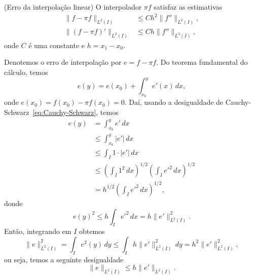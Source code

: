 \begin{prop}\normalfont(Erro da interpolação linear)\label{prop:interp_lin}
  O interpolador $\pi f$ satisfaz as estimativas
  \begin{align}
    \|f-\pi f\|_{L^2(I)} &\leq Ch^2\|f''\|_{L^2(I)},\\
    \|(f-\pi f)'\|_{L^2(I)} &\leq Ch\|f''\|_{L^2(I)},
  \end{align}
onde $C$ é uma constante e $h=x_1-x_0$.
\end{prop}
\begin{dem}
  Denotemos o erro de interpolação por $e = f - \pi f$. Do teorema fundamental do cálculo, temos
  \begin{equation}
    e(y) = e(x_0) + \int_{x_0}^y e'(x)\,dx,
  \end{equation}
onde $e(x_0)=f(x_0)-\pi f(x_0) = 0$. Daí, usando a desigualdade de Cauchy-Schwarz~\eqref{eq:Cauchy-Schwarz}, temos
\begin{align}
  e(y) &= \int_{x_0}^y e'\,dx\\
       &\leq \int_{x_0}^y |e'|\,dx\\
       &\leq \int_{I} 1\cdot |e'|\,dx\\
       &\leq \left(\int_{I} 1^2\,dx\right)^{1/2} \left(\int_{I} e'^2\,dx\right)^{1/2}\\
       &= h^{1/2}\left(\int_{I} e'^2\,dx\right)^{1/2},
\end{align}
donde
\begin{equation}
  e(y)^2 \leq h\int_I e'^2\,dx = h\|e'\|_{L^2(I)}^2.
\end{equation}
Então, integrando em $I$ obtemos
\begin{equation}
  \|e\|_{L^2(I)}^2 = \int_I e^2(y)\,dy \leq \int_I h\|e'\|_{L^2(I)}^2\,dy = h^2\|e'\|_{L^2(I)}^2,
\end{equation}
ou seja, temos a seguinte desigualdade
\begin{equation}\label{eq:prop_pif_0}
  \|e\|_{L^2(I)} \leq h\|e'\|_{L^2(I)}.
\end{equation}


\end{dem}
